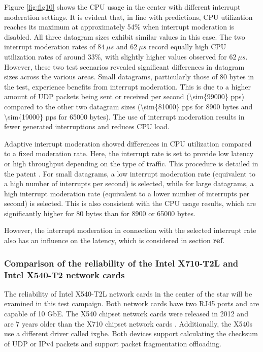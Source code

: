 \documentclass[	a4paper,
				11pt,
				DIV=11,
				bigheadings,
				idxtotoc,
				listof=totoc,	
				bibtotoc,		
				halfparskip,
				cleardoubleempty,
				oneside,
				openright]{scrartcl}
\begin{document}
Figure \ref{fig:fig10} shows the CPU usage in the center with different interrupt moderation settings. It is evident that, in line with predictions, CPU utilization reaches its maximum at approximately 54\% when interrupt moderation is disabled. All three datagram sizes exhibit similar values in this case. The two interrupt moderation rates of \( 84\ \mu s \) and \( 62\ \mu s \) record equally high CPU utilization rates of around 33\%, with slightly higher values observed for \( 62\ \mu s \). However, these two test scenarios revealed significant differences in datagram sizes across the various areas. Small datagrams, particularly those of 80 bytes in the test, experience benefits from interrupt moderation. This is due to a higher amount of UDP packets being sent or received per second (\num{\sim{99000}} pps) compared to the other two datagram sizes (\num{\sim{81000}} pps for 8900 bytes and \num{\sim{19000}} pps for 65000 bytes). The use of interrupt moderation results in fewer generated interruptions and reduces CPU load.

Adaptive interrupt moderation showed differences in CPU utilization compared to a fixed moderation rate. Here, the interrupt rate is set to provide low latency or high throughput depending on the type of traffic. This procedure is detailed in the patent \cite{tbd}. For small datagrams, a low interrupt moderation rate (equivalent to a high number of interrupts per second) is selected, while for large datagrams, a high interrupt moderation rate (equivalent to a lower number of interrupts per second) is selected. This is also consistent with the CPU usage results, which are significantly higher for 80 bytes than for 8900 or 65000 bytes.

However, the interrupt moderation in connection with the selected interrupt rate also has an influence on the latency, which is considered in section \textbf{ref}.


\subsubsection{Comparison of the reliability of the Intel X710-T2L and Intel X540-T2 network cards}

The reliability of Intel X540-T2L network cards in the center of the star will be examined in this test campaign. Both network cards have two RJ45 ports and are capable of 10 GbE. The X540 chipset network cards were released in 2012 and are 7 years older than the X710 chipset network cards \cite{tbd}\cite{tbd}. Additionally, the X540s use a different driver called ixgbe. Both devices support calculating the checksum of UDP or IPv4 packets and support packet fragmentation offloading.
\end{document}
